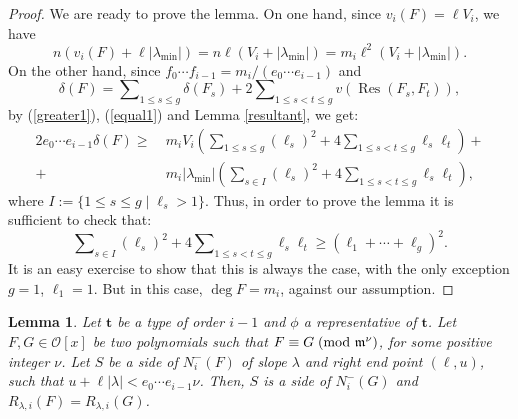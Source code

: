 \documentclass{amsart}
\newtheorem{lemma}[theorem]{Lemma}
\begin{document}
\begin{proof}
We are ready to prove the lemma. On one hand, since $v_i(F)=\ell V_i$, we have
$$
n(v_i(F)+\ell|{\lambda_{\operatorname{min}}}|)=n\ell(V_i+|{\lambda_{\operatorname{min}}}|)=m_i\ell^2(V_i+|{\lambda_{\operatorname{min}}}|).
$$On the other hand, since $f_0\cdots f_{i-1}=m_i/(e_0\cdots e_{i-1})$ and 
$$
\delta(F)=\sum\nolimits_{1\le s\le g}\delta(F_s)+2\sum\nolimits_{1\le s<t\le g}v({\operatorname{Res}}(F_s,F_t)),
$$
by (\ref{greater1}), (\ref{equal1}) and Lemma \ref{resultant}, we get:
\begin{align*}
2e_0\cdots e_{i-1}\delta(F)\ge&\ m_iV_i\left(\sum\nolimits_{1\le s\le g}(\ell_s)^2+4\sum\nolimits_{1\le s<t\le g}\ell_s\ell_t\right)+\\+&\ m_i|{\lambda_{\operatorname{min}}}|\left(\sum\nolimits_{s\in I}(\ell_s)^2+4\sum\nolimits_{1\le s<t\le g}\ell_s\ell_t\right),
\end{align*}
where $I:=\{1\le s\le g\mid \ell_s>1\}$. Thus, in order to prove the lemma
it is sufficient to check that:
$$
\sum\nolimits_{s\in I}(\ell_s)^2+4\sum\nolimits_{1\le s<t\le g}\ell_s\ell_t\ge (\ell_1+\cdots+\ell_g)^2.
$$
It is an easy exercise to show that this is always the case, with the only exception $g=1$, $\ell_1=1$. But in this case, $\deg F=m_i$, against our assumption. 
\end{proof}

\begin{lemma}\label{belowline}
Let ${\mathbf{t}}$ be a type of order $i-1$ and $\phi$ a representative of ${\mathbf{t}}$. Let $F,G\in{\mathcal{O}}[x]$ be two polynomials such that $F\equiv G{\; \mbox{\rm(mod }{{{{\mathfrak m}}^\nu}})}$, for some positive integer $\nu$. Let $S$ be a side of $N_i^-(F)$ of slope $\lambda$ and right end point $(\ell,u)$, such that $u+\ell|\lambda|< e_0\cdots e_{i-1}\nu$. Then, $S$ is a side of $N_i^-(G)$ and $R_{\lambda,i}(F)=R_{\lambda,i}(G)$.
\end{lemma}
\end{document}
